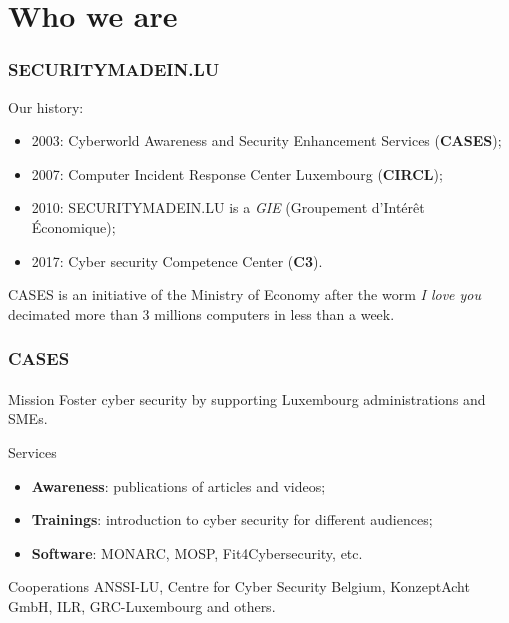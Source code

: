 %
%
\section*{Who we are}
\begin{frame}
  \frametitle{SECURITYMADEIN.LU}
  Our history:
  \begin{center}
    \begin{itemize}
      \item 2003: Cyberworld Awareness and Security Enhancement Services (\textbf{CASES});
      \item 2007: Computer Incident Response Center Luxembourg (\textbf{CIRCL});
      \item 2010: SECURITYMADEIN.LU is a \textit{GIE} (Groupement d’Intérêt Économique);
      \item 2017: Cyber security Competence Center (\textbf{C3}).
    \end{itemize}
  \end{center}
  CASES is an initiative of the Ministry of Economy after the worm
  \textit{I love you} decimated more than 3 millions computers in less than a week.
\end{frame}

\begin{frame}
  \frametitle{CASES}
  \framesubtitle{}
  \begin{block}{Mission}
    Foster cyber security by supporting Luxembourg administrations and SMEs.
  \end{block}

  \begin{block}{Services}
    \begin{center}
      \begin{itemize}
        \item \textbf{Awareness}: publications of articles and videos;
        \item \textbf{Trainings}:
        introduction to cyber security for different audiences;
        \item \textbf{Software}:
        MONARC, MOSP, Fit4Cybersecurity, etc.
      \end{itemize}
    \end{center}
  \end{block}

  \begin{block}{Cooperations}
    ANSSI-LU,
    Centre for Cyber Security Belgium, KonzeptAcht GmbH, ILR, GRC-Luxembourg and others.
  \end{block}
\end{frame}

